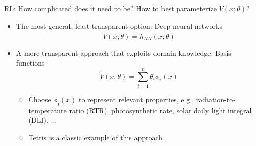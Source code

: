\documentclass[xcolor=dvipsnames,aspectratio=169]{beamer}
\begin{document}
\begin{frame}[noframenumbering]{RL: How complicated does it need to be?}
	How to best parameterize $\tilde{V}(x;\theta)$?
	\begin{itemize}
		\item The most general, least transparent option: Deep neural networks 
		\begin{equation*}
			\tilde{V}(x;\theta) = h_{NN}(x;\theta) 
		\end{equation*}
		\pause
		\item A more transparent approach that exploits domain knowledge: 
		Basis functions
		\begin{equation*}
			\tilde{V}(x;\theta) = \sum_{i=1}^{n}\theta_i \phi_i(x)
		\end{equation*}
		\begin{itemize}
			\item Choose $\phi_i(x)$ to represent relevant properties, e.g., 
			radiation-to-temperature ratio (RTR), photosynthetic rate, solar 
			daily light integral (DLI), $\dots$ 
			\item Tetris is a classic example of this approach.
		\end{itemize}
	\end{itemize}
\end{frame}
\end{document}
